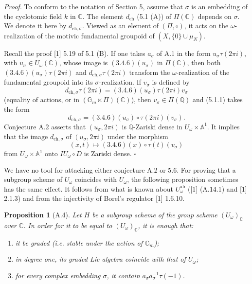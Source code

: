 \documentclass[10pt,a4paper]{article}
\newcommand{\Gm}{\mathbb G_m}
\newcommand{\Q}{\mathbb Q}
\newcommand{\A}{\mathbb A}
\newcommand{\C}{\mathbb C}
\theoremstyle{deligne}
\newtheorem*{proposition*}{Proposition}
\newenvironment{proofdel}{\textit{Proof.}}{\hfill$\square$}
\newcommand{\heading}[1]{\vspace{0.65em}\noindent{\bfseries #1}\quad}
\begin{document}
\begin{proofdel}
To conform to the notation of Section 5, assume that \(\sigma\) is an embedding of the cyclotomic field \(k\) in \(\C\). The element \(d_{\mathrm{ch}}\) (5.1 (A)) of \(\Pi(\C)\) depends on \(\sigma\). We denote it here by \(d_{\mathrm{ch},\sigma}\). Viewed as an element of \((\Pi,\circ)\), it acts on the \(\omega\)-realization of the motivic fundamental groupoid of \((X,\{0\}\cup\mu_N)\).

Recall the proof [1] 5.19 of 5.1 (B). If one takes \(a_\sigma\) of A.1 in the form \(u_\sigma\tau(2\pi i)\), with \(u_\sigma\in U_\omega(\C)\), whose image is \((3.4.6)(u_\sigma)\) in \(\Pi(\C)\), then both \((3.4.6)(u_\sigma)\tau(2\pi i)\) and \(d_{\mathrm{ch},\sigma}\tau(2\pi i)\) transform the \(\omega\)-realization of the fundamental groupoid into its \(\sigma\)-realization. If \(v_\sigma\) is defined by
\[
d_{\mathrm{ch},\sigma}\tau(2\pi i)=(3.4.6)(u_\sigma)\tau(2\pi i)v_\sigma
\]
(equality of actions, or in \((\Gm\ltimes\Pi)(\C)\)), then \(v_\sigma\in\Pi(\Q)\) and (5.1.1) takes the form
\[
\tag{A.3.1}
d_{\mathrm{ch},\sigma}=(3.4.6)(u_\sigma)\circ\tau(2\pi i)(v_\sigma).
\]
Conjecture A.2 asserts that \((u_\sigma,2\pi i)\) is \(\Q\)-Zariski dense in \(U_\omega\times\A^1\). It implies that the image \(d_{\mathrm{ch},\sigma}\) of \((u_\sigma,2\pi i)\) under the morphism
\[
(x,t)\longmapsto(3.4.6)(x)\circ\tau(t)(v_\sigma)
\]
from \(U_\omega\times\A^1\) onto \(IU_\omega\circ D\) is Zariski dense.
\end{proofdel}

\heading{A.4.} We have no tool for attacking either conjecture A.2 or 5.6. For proving that a subgroup scheme of \(U_\omega\) coincides with \(U_\omega\), the following proposition sometimes has the same effect. It follows from what is known about \(U_\omega^{\mathrm{ab}}\) ([1] (A.14.1) and [1] 2.1.3) and from the injectivity of Borel's regulator [1] 1.6.10.

\begin{proposition*}[A.4]
Let \(H\) be a subgroup scheme of the group scheme \((U_\omega)_\C\) over \(\C\). In order for it to be equal to \((U_\omega)_\C\), it is enough that:
\begin{enumerate}[label=(\alph*)]
\item it be graded (i.e. stable under the action of \(\Gm\));
\item in degree one, its graded Lie algebra coincide with that of \(U_\omega\);
\item for every complex embedding \(\sigma\), it contain \(a_\sigma\bar a_\sigma^{-1}\tau(-1)\).
\end{enumerate}
\end{proposition*}
\end{document}
